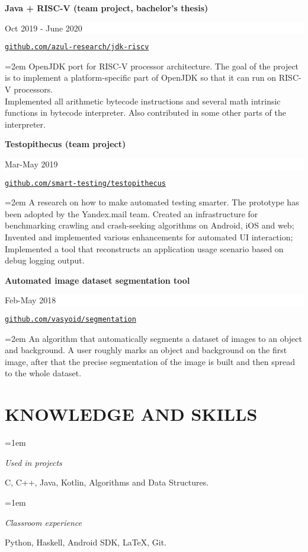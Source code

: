 \documentclass[paper=a4,fontsize=11pt]{scrartcl} %
\newlength{\spacebox}
\newcommand{\sepspace}{\vspace*{0.5em}}		%
\newcommand{\NewPart}[1]{\section*{\uppercase{#1}}}
\newcommand{\PersonalEntry}[2]{
		\noindent\hangindent=2em\hangafter=0 %
		\parbox{\spacebox}{        %
		\textit{#1}}		       %
		\hspace{1.5em} #2 \par}    %
\newcommand{\SkillsEntry}[2]{      %
		\noindent\hangindent=1em\hangafter=0 %
		\parbox{100pt}{	        %
		\textit{#1}}			   %
		\hspace{1.5em} #2 \par}    %
\newcommand{\SomeEntry}[4]{
		\noindent \textbf{#1} \hfill      %
		\colorbox{White}{%
			\parbox{12em}{%
			\hfill\color{Black}#2}} \par  %
		\noindent \texttt{#3} \par        %
		\noindent\hangindent=2em\hangafter=0 \small #4 %
		\normalsize \par}
\begin{document}
\SomeEntry{Java + RISC-V (team project, bachelor's thesis)}{Oct 2019 - June 2020}{\href{https://github.com/azul-research/jdk-riscv}{github.com/azul-research/jdk-riscv}}{OpenJDK port for RISC-V processor architecture. The goal of the project is to implement a platform-specific part of OpenJDK so that it can run on RISC-V processors.\\
Implemented all arithmetic bytecode instructions and several math intrinsic functions in bytecode interpreter. Also contributed in some other parts of the interpreter.}
\sepspace
\SomeEntry{Testopithecus (team project)}{Mar-May 2019}{\href{https:/github.com/smart-testing/testopithecus}{github.com/smart-testing/testopithecus}}{A research on how to make automated testing smarter. The prototype has been adopted by the Yandex.mail team.
	Created an infrastructure for benchmarking crawling and crash-seeking algorithms on Android, iOS and web;
	Invented and implemented various enhancements for automated UI interaction;
	Implemented a tool that reconstructs an application usage scenario based on debug logging output.} 
\sepspace
\SomeEntry{Automated image dataset segmentation tool}{Feb-May 2018}{\href{https://github.com/vasyoid/segmentation}{github.com/vasyoid/segmentation}}{An algorithm that automatically segments a dataset of images to an object and background. A user roughly marks an object and background on the first image, after that the precise segmentation of the image is built and then spread to the whole dataset.} 

\NewPart{Knowledge and Skills}

\SkillsEntry{Used in projects}{C, C++, Java, Kotlin, Algorithms and Data Structures.}
\SkillsEntry{Classroom experience}{Python, Haskell, Android SDK, \LaTeX, Git.}
\end{document}
